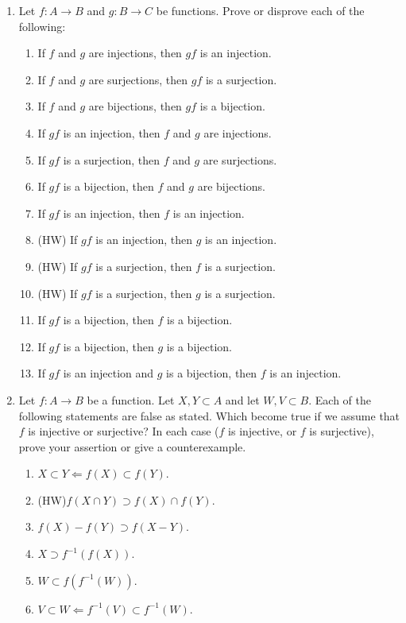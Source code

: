 \documentclass[12pt, reqno]{amsart}
\begin{document}
\begin{enumerate}
\newpage
\item   Let $f\colon A \to B$ and $g \colon B \to C$ be functions. Prove or
  disprove each of the following:
  \begin{enumerate}
  \item If $f$ and $g$ are injections, then $gf$ is an injection.
  \item If $f$ and $g$ are surjections, then $gf$ is a surjection.
  \item If $f$ and $g$ are bijections, then $gf$ is a bijection.
  \item If $gf$ is an injection, then $f$ and $g$ are injections.
  \item If $gf$ is a surjection, then $f$ and $g$ are surjections.
  \item If $gf$ is a bijection, then $f$ and $g$ are bijections.
  \item If $gf$ is an injection, then $f$ is an injection.
  \item (HW) If $gf$ is an injection, then $g$ is an injection.
  \item (HW) If $gf$ is a surjection, then $f$ is a surjection.
  \item (HW) If $gf$ is a surjection, then $g$ is a surjection.
  \item If $gf$ is a bijection, then $f$ is a bijection.
  \item If $gf$ is a bijection, then $g$ is a bijection.
  \item If $gf$ is an injection and $g$ is a bijection, then $f$ is an
    injection.
  \end{enumerate}

\vspace{1in}

\item Let $f\colon A \to B$ be a function. Let $X,Y \subset
  A$ and let $W,V \subset B$. Each of the following statements are false as stated. Which
  become true if we assume that $f$ is injective or surjective? In
  each case ($f$ is injective, or $f$ is surjective), prove your
  assertion or give a counterexample.
  \begin{enumerate}
  \item $X \subset Y \Leftarrow f(X) \subset f(Y)$.
  \item (HW)$f(X \cap Y) \supset f(X) \cap f(Y)$.
  \item $f(X) - f(Y) \supset f(X - Y)$.
  \item $X \supset f^{-1}(f(X))$.
  \item $W \subset f(f^{-1}(W))$.
  \item $V \subset W \Leftarrow f^{-1}(V) \subset f^{-1}(W)$.
  \end{enumerate}


  
\end{enumerate}
\end{document}
